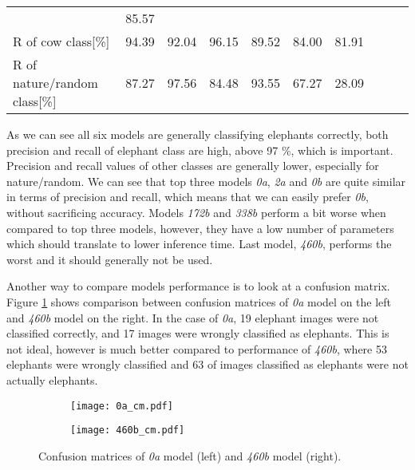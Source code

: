 \begin{table}[ht]
{\begin{tabular}{lrrrrrrrrr}
                                        & \cellcolor{tbred}85.57\\
        R of cow class[\%]              & \cellcolor{tbgreeny}94.39     
                                        & \cellcolor{tbyellow}92.04   
                                        & \cellcolor{tbgreen}96.15   
                                        & \cellcolor{tbyellow}89.52  
                                        & \cellcolor{tbyellow}84.00  
                                        & \cellcolor{tbred}81.91\\
        R of nature/random class[\%]    & \cellcolor{tbyellow}87.27     
                                        & \cellcolor{tbgreen}97.56   
                                        & \cellcolor{tbyellow}84.48   
                                        & \cellcolor{tbgreeny}93.55  
                                        & \cellcolor{tbyellow}67.27  
                                        & \cellcolor{tbred}28.09\\\bottomrule
    \end{tabular}}
    \label{precision_recall_table}
\end{table}

As we can see all six models are generally classifying elephants correctly, both precision and recall of elephant class are high, above 97 \%, which is important.
Precision and recall values of other classes are generally lower, especially for nature/random.
We can see that top three models \textit{0a}, \textit{2a} and \textit{0b} are quite similar in terms of precision and recall, which means that we can easily prefer \textit{0b}, without sacrificing accuracy. 
Models \textit{172b} and \textit{338b} perform a bit worse when compared to top three models, however, they have a low number of parameters which should translate to lower inference time.
Last model, \textit{460b}, performs the worst and it should generally not be used.

Another way to compare models performance is to look at a confusion matrix.
Figure \ref{double_cm} shows comparison between confusion matrices of \textit{0a} model on the left and \textit{460b} model on the right.
In the case of \textit{0a}, 19 elephant images were not classified correctly, and 17 images were wrongly classified as elephants.
This is not ideal, however is much better compared to performance of \textit{460b}, where 53 elephants were wrongly classified and 63 of images classified as elephants were not actually elephants.
\newline
\begin{figure}[ht]
    \begin{subfigure}{0.5\textwidth}
        \centering
        \texttt{[image: 0a\_cm.pdf]} 
    \end{subfigure}
    \begin{subfigure}{0.5\textwidth}
        \centering
        \texttt{[image: 460b\_cm.pdf]}
    \end{subfigure}
    \caption{Confusion matrices of \textit{0a} model (left) and \textit{460b} model (right).}
    \label{double_cm}
\end{figure}
\clearpage

